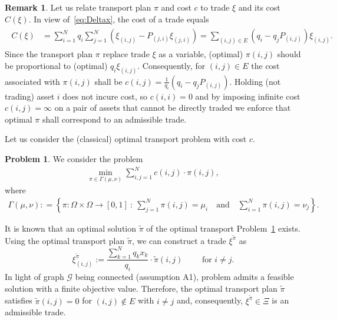 \documentclass{article}
\theoremstyle{definition}
\newtheorem{remark}[theorem]{Remark}
\newtheorem{problem}[theorem]{Problem}
\begin{document}
\begin{remark}
Let us relate transport plan $\pi$ and cost $c$ to trade $\xi$ and its cost $C(\xi)$. In view of~\eqref{eq:Deltax}, the cost of a trade equals
\begin{align} \label{eq:costC}
\begin{split}
C(\xi) &= \sum\limits_{i=1}^N q_i \sum\limits_{j=1}^N  (\xi_{(i, j)} - P_{(j,i)} \xi_{(j,i)}) = \sum\limits_{(i,j) \in E} (q_i - q_j P_{(i,j)}) \xi_{(i,j)}.
\end{split}
\end{align} 
Since the transport plan $\pi$ replace trade $\xi$ as a variable, (optimal) $\pi(i,j)$ should be proportional to (optimal) $q_i \xi_{(i,j)}$. Consequently, for $(i,j) \in E$ the cost associated with $\pi(i,j)$ shall be $c(i,j) = \frac{1}{q_i} (q_i - q_j P_{(i,j)})$.  Holding (not trading) asset $i$ does not incure cost, so $c(i,i) = 0$ and by imposing infinite cost $c(i,j) = \infty$ on a pair of assets that cannot be directly traded we enforce that optimal $\pi$ shall correspond to an admissible trade.
\end{remark}

Let us consider the (classical) optimal transport problem with cost $c$.
\begin{problem} \label{prob:Rebalance-OT1}
We consider the problem 
\begin{align*}
    \min_{\pi \in \Gamma(\mu, \nu)} \sum_{i,j =1}^N c(i,j) \cdot  \pi(i,j),
\end{align*}
 where 
\begin{align*}
    \Gamma(\mu, \nu) : = \left\{ \pi: \Omega \times \Omega \to [0,1] \ : \ \sum_{j=1}^N \pi(i,j) = \mu_i \quad \mbox{and} \quad \sum_{i=1}^N \pi(i,j) = \nu_j  \right\}.
\end{align*}
\end{problem}

It is known that an optimal solution $\tilde{\pi}$ of the optimal transport Problem~\ref{prob:Rebalance-OT1} exists. Using the optimal transport plan $\tilde{\pi}$, we can construct a trade $\xi^{\tilde{\pi}}$ as
\[
\xi^{\tilde{\pi}}_{(i,j)} := \frac{\sum_{k=1}^N q_k x_k}{q_i} \cdot \tilde{\pi}(i, j) \quad \quad \text{ for } i \neq j.
\]
In light of graph $\mathcal{G}$ being connected (assumption A1), problem admits a feasible solution with a finite objective value. Therefore, the optimal transport plan $\tilde{\pi}$ satisfies $\tilde{\pi}(i, j) = 0$ for $(i,j) \not\in E$ with $i \neq j$ and, consequently, $\xi^{\tilde{\pi}} \in \Xi$ is an admissible trade.
\end{document}

